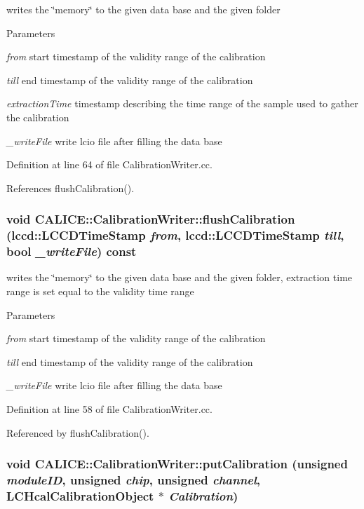 writes the \char`\"{}memory\char`\"{} to the given data base and the given folder 
\begin{DoxyParams}{Parameters}
\item[{\em from}]start timestamp of the validity range of the calibration \item[{\em till}]end timestamp of the validity range of the calibration \item[{\em extractionTime}]timestamp describing the time range of the sample used to gather the calibration \item[{\em \_\-writeFile}]write lcio file after filling the data base \end{DoxyParams}


Definition at line 64 of file CalibrationWriter.cc.

References flushCalibration().
\subsubsection[{flushCalibration}]{\setlength{\rightskip}{0pt plus 5cm}void CALICE::CalibrationWriter::flushCalibration (lccd::LCCDTimeStamp {\em from}, \/  lccd::LCCDTimeStamp {\em till}, \/  bool {\em \_\-writeFile}) const}\label{classCALICE_1_1CalibrationWriter_aab7826e8fdea7f7219d9199ddebdd328}


writes the \char`\"{}memory\char`\"{} to the given data base and the given folder, extraction time range is set equal to the validity time range 
\begin{DoxyParams}{Parameters}
\item[{\em from}]start timestamp of the validity range of the calibration \item[{\em till}]end timestamp of the validity range of the calibration \item[{\em \_\-writeFile}]write lcio file after filling the data base \end{DoxyParams}


Definition at line 58 of file CalibrationWriter.cc.

Referenced by flushCalibration().
\subsubsection[{putCalibration}]{\setlength{\rightskip}{0pt plus 5cm}void CALICE::CalibrationWriter::putCalibration (unsigned {\em moduleID}, \/  unsigned {\em chip}, \/  unsigned {\em channel}, \/  {\bf LCHcalCalibrationObject} $\ast$ {\em Calibration})}\label{classCALICE_1_1CalibrationWriter_ad95b3f390a1a8f6fb035e46d7ffc8411}


